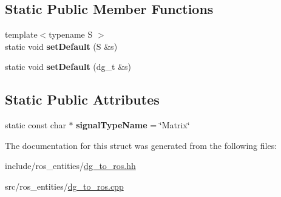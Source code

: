 \subsection*{Static Public Member Functions}
\begin{DoxyCompactItemize}
\item 
\mbox{\label{structdynamic__graph_1_1DgToRos_3_01Matrix_01_4_a4c32ea6763c10fad6c10f65d60177ea0}} 
{\footnotesize template$<$typename S $>$ }\\static void {\bfseries set\+Default} (S \&s)
\item 
\mbox{\label{structdynamic__graph_1_1DgToRos_3_01Matrix_01_4_a2dbd196e96c7b672a7953911d7dc7700}} 
static void {\bfseries set\+Default} (dg\+\_\+t \&s)
\end{DoxyCompactItemize}
\subsection*{Static Public Attributes}
\begin{DoxyCompactItemize}
\item 
\mbox{\label{structdynamic__graph_1_1DgToRos_3_01Matrix_01_4_a67981664123dbd7194d1ceb6e370fcd6}} 
static const char $\ast$ {\bfseries signal\+Type\+Name} = \char`\"{}Matrix\char`\"{}
\end{DoxyCompactItemize}


The documentation for this struct was generated from the following files\+:\begin{DoxyCompactItemize}
\item 
include/ros\+\_\+entities/\hyperlink{dg__to__ros_8hh}{dg\+\_\+to\+\_\+ros.\+hh}\item 
src/ros\+\_\+entities/\hyperlink{dg__to__ros_8cpp}{dg\+\_\+to\+\_\+ros.\+cpp}\end{DoxyCompactItemize}
